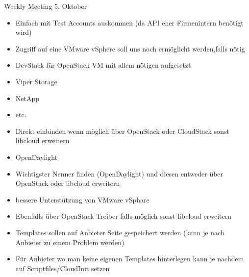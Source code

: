 \begin{Protokoll}{Weekly Meeting 5. Oktober}
\protokollKopf

\begin{itemize}
  \item Einfach mit Test Accounts auskommen (da API eher Firmenintern benötigt wird)
  \item Zugriff auf eine VMware vSphere soll uns noch ermöglicht werden,falls 
  nötig
  \item DevStack für OpenStack VM mit allem nötigen aufgesetzt
\end{itemize}

\begin{itemize}
  \item Viper Storage
  \item NetApp
  \item etc.
  \item Direkt einbinden wenn möglich über OpenStack oder CloudStack sonst 
  libcloud erweitern
\end{itemize}

\begin{itemize}
  \item OpenDaylight
  \item Wichtigster Nenner finden (OpenDaylight) und diesen entweder über 
  OpenStack oder libcloud erweitern
\end{itemize}

\begin{itemize}
  \item bessere Unterstützung von VMware vSphare
  \item Ebenfalls über OpenStack Treiber falls möglich sonst libcloud erweitern
\end{itemize}

\begin{itemize}
  \item Templates sollen auf Anbieter Seite gespeichert werden (kann je nach 
  Anbieter zu einem Problem werden)
  \item Für Anbieter wo man keine eigenen Templates hinterlegen kann je nachdem 
  auf Scriptfiles/CloudInit setzen
\end{itemize}


\end{Protokoll}
